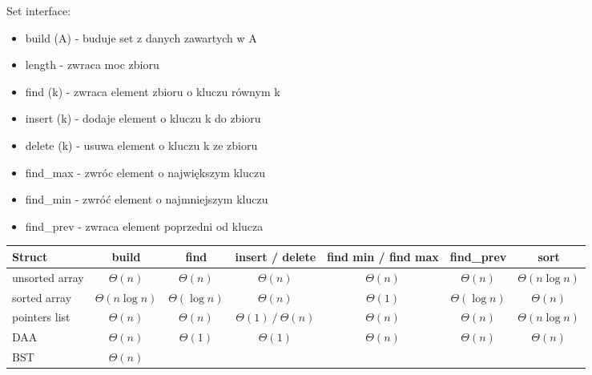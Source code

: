 \documentclass{article}
\begin{document}
    Set interface: \par
    \begin{itemize}
        \item build (A) - buduje set z danych zawartych w A
        \item length - zwraca moc zbioru
        \item find (k) - zwraca element zbioru o kluczu równym k
        \item insert (k) - dodaje element o kluczu k do zbioru
        \item delete (k) - usuwa element o kluczu k ze zbioru
        \item find\_max - zwróc element o największym kluczu
        \item find\_min - zwróć element o najmniejszym kluczu
        \item find\_prev - zwraca element poprzedni od klucza
    \end{itemize}
    \newpage 
    \vspace*{\fill}
    \begin{table}[H]
    \centering
    \begin{tabular}{lcccccc}
    \toprule
    \textbf{Struct} & \textbf{build} & \textbf{find} & \textbf{insert / delete} & \textbf{find min / find max} & \textbf{find\_prev} & \textbf{sort} \\
    \midrule
    unsorted array       & $\Theta(n)$         & $\Theta(n)$         & $\Theta(n)$               & $\Theta(n)$              & $\Theta(n)$          & $\Theta(n \log n)$ \\
    sorted array         & $\Theta(n \log n)$  & $\Theta(\log n)$    & $\Theta(n)$               & $\Theta(1)$              & $\Theta(\log n)$     & $\Theta(n)$ \\
    pointers list & $\Theta(n)$         & $\Theta(n)$         & $\Theta(1)\ /\ \Theta(n)$ & $\Theta(n)$              & $\Theta(n)$          & $\Theta(n \log n)$ \\
    DAA                  & $\Theta(n)$         & $\Theta(1)$         & $\Theta(1)$               & $\Theta(n)$              & $\Theta(n)$          & $\Theta(n)$ \\
    BST                  & $\Theta(n)$         &                     &                            &                          &                      & \\
    \bottomrule
    \end{tabular}
    \end{table}
    \vspace*{\fill}
\end{document}

